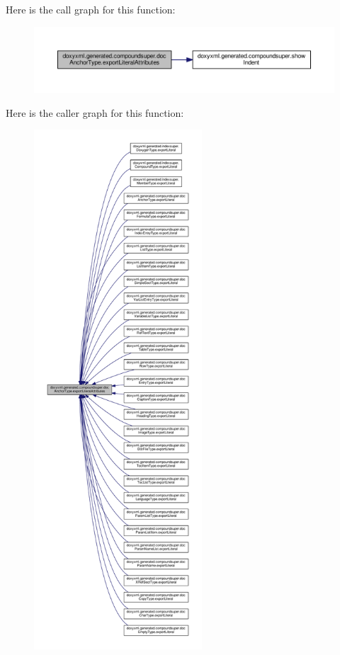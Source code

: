 Here is the call graph for this function\+:
\nopagebreak
\begin{figure}[H]
\begin{center}
\leavevmode
\includegraphics[width=350pt]{db/df1/classdoxyxml_1_1generated_1_1compoundsuper_1_1docAnchorType_a17f85b04f742382951c32df5934d5119_cgraph}
\end{center}
\end{figure}




Here is the caller graph for this function\+:
\nopagebreak
\begin{figure}[H]
\begin{center}
\leavevmode
\includegraphics[height=550pt]{db/df1/classdoxyxml_1_1generated_1_1compoundsuper_1_1docAnchorType_a17f85b04f742382951c32df5934d5119_icgraph}
\end{center}
\end{figure}


